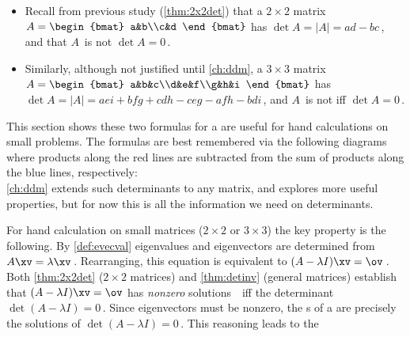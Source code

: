 \begin{itemize}
\item Recall from previous study (\cref{thm:2x2det}) that a \(2\times 2\) matrix \(A=\begin{bmat} a&b\\c&d \end{bmat}\) has  \(\det A=|A|=ad-bc\)\,, and that \(A\)~is not   \(\det A=0\)\,.
\item Similarly, although not justified until \cref{ch:ddm}, a \(3\times 3\) matrix \(A=\begin{bmat} a&b&c\\d&e&f\\g&h&i \end{bmat}\) has  \(\det A=|A|=aei+bfg+cdh-ceg-afh-bdi\)\,, and \(A\)~is not  iff \(\det A=0\)\,.
\end{itemize}
This section shows these two formulas for a  are useful for hand calculations on small problems.
The formulas are best remembered via the following diagrams where products along the red lines are subtracted from the sum of products along the blue lines, respectively:
\begin{equation}

\label{eq:dets23}
\end{equation}
\cref{ch:ddm} extends such determinants to any  matrix, and explores more useful properties, but for now this is all the information we need on determinants.


For hand calculation on small matrices (\(2\times 2\) or \(3\times3\)) the key property is the following.
By \cref{def:evecval} eigenvalues and eigenvectors are determined from \(A\xv=\lambda\xv\)\,.  
Rearranging, this equation is equivalent to \((A-\lambda I)\xv=\ov\)\,.  
Both \cref{thm:2x2det} (\(2\times2\) matrices) and \cref{thm:detinv} (general matrices) establish that \((A-\lambda I)\xv=\ov\) has \emph{nonzero} solutions~\xv\ iff the determinant \(\det(A-\lambda I)=0\)\,.
Since eigenvectors must be nonzero, the s of a  are precisely the solutions of \(\det(A-\lambda I)=0\)\,. 
This reasoning leads to the 


